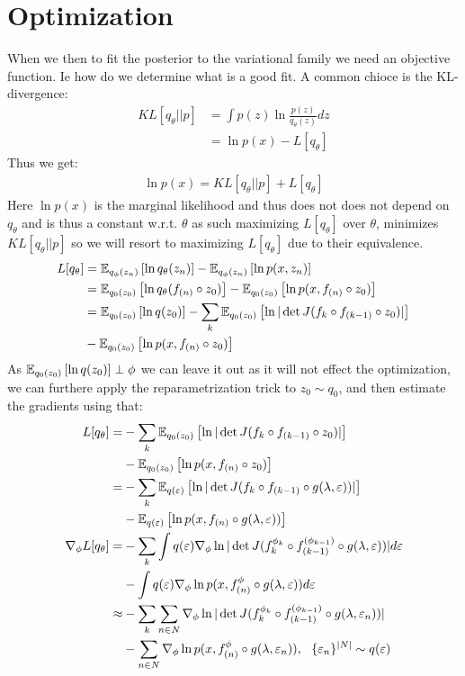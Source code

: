 \section{Optimization}\label{Ch:Opt}
When we then to fit the posterior to the variational family we need an objective function. Ie how do we determine what is a good fit. A common chioce is the KL-divergence:
\begin{align*}
    KL[q_\theta || p] & = \int p(z) \ln \frac{p(z)}{q_\theta(z)}dz\\
    & = \ln p(x) - L[q_\theta]
\end{align*}
Thus we get:
\begin{align*}
    \ln p(x)= KL[q_\theta||p] + L[q_\theta]
\end{align*}
Here $\ln p(x)$ is the marginal likelihood and thus does not does not depend on $q_\theta$ and is thus a constant w.r.t. $\theta$ as such maximizing $L[q_\theta]$ over $\theta$, minimizes $KL[q_\theta||p]$ so we will resort to maximizing $L[q_\theta]$ due to their equivalence.
\begin{align*}
    L[q_\theta] & = \mathbb{E}_{q_\phi(z_n)}\left[\ln q_\theta(z_n)\right]-\mathbb{E}_{q_\phi(z_n)}\left[\ln p(x,z_n)\right]\\
    & = \mathbb{E}_{q_0(z_0)}\left[\ln q_\theta(f_{(n)}\circ z_0)\right]-\mathbb{E}_{q_0(z_0)}\left[\ln p(x,f_{(n)}\circ z_0)\right]\\
    & = \mathbb{E}_{q_0(z_0)}\left[\ln q(z_0)\right]-\sum_k\mathbb{E}_{q_0(z_0)}\left[\ln|\det J(f_k \circ f_{(k-1)}\circ z_0)|\right] \\&-\mathbb{E}_{q_0(z_0)}\left[\ln p(x,f_{(n)}\circ z_0)\right]
\end{align*}
As $\mathbb{E}_{q_0(z_0)}\left[\ln q(z_0)\right]\perp\phi$ we can leave it out as it will not effect the optimization, we can furthere apply the reparametrization trick to $z_0\sim q_0$, and then estimate the gradients using that:
\begin{align*}
     L[q_\theta] = & -\sum_k\mathbb{E}_{q_0(z_0)}\left[\ln|\det J(f_k \circ f_{(k-1)}\circ z_0)|\right] 
     \\&-\mathbb{E}_{q_0(z_0)}\left[\ln p(x,f_{(n)}\circ z_0)\right]\\
     = & -\sum_k\mathbb{E}_{q(\varepsilon)}\left[\ln|\det J(f_k \circ f_{(k-1)}\circ g(\lambda,\varepsilon))|\right] 
     \\&-\mathbb{E}_{q(\varepsilon)}\left[\ln p(x,f_{(n)}\circ g(\lambda,\varepsilon))\right]\\
     \nabla_\phi L[q_\theta] = & -\sum_k\int q(\varepsilon)\nabla_\phi \ln|\det J(f^{\phi_k}_k \circ f^{(\phi_{k-1})}_{(k-1)}\circ g(\lambda,\varepsilon))|d\varepsilon \\ & -\int q(\varepsilon)\nabla_\phi \ln p(x,f^\phi_{(n)}\circ g(\lambda,\varepsilon))d\varepsilon\\
     \approx & -\sum_k\sum_{n\in N}\nabla_\phi \ln|\det J(f^{\phi_k}_k \circ f^{(\phi_{k-1})}_{(k-1)}\circ g(\lambda,\varepsilon_n))| \\ 
     & -\sum_{n \in N}\nabla_\phi \ln p(x,f^\phi_{(n)}\circ g(\lambda,\varepsilon_n)), \ \ \{\varepsilon_n\}^{|N|} \sim q(\varepsilon)
\end{align*}
